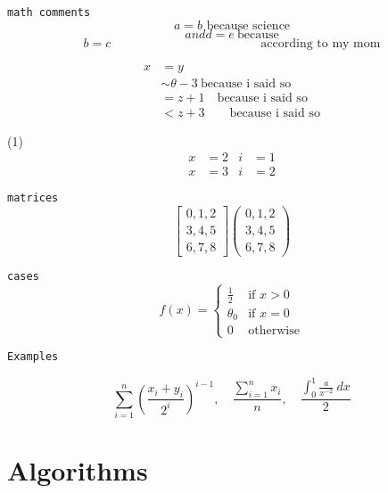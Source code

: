 \documentclass[11pt, oneside]{article}   	%
\newcommand{\bp}[1]{\left( #1 \right)}
\begin{document}
$\ $

\texttt{math comments}
$$ a = b \text{ because science}$$
$$ and d = e \ \text{because}$$
$$ b = c \hspace{2in} \text{according to my mom}$$

\begin{align*}
x &= y \\
&\sim \theta - 3 \ \text{because i said so} \\
&= z + 1 \quad \text{because i said so} \\
&< z + 3 \qquad \text{because i said so}
\end{align*}

(1)
\begin{align*}
x &= 2 & i &= 1 \\
x &= 3 & i &= 2
\end{align*}

\texttt{matrices}
$$ 
\begin{bmatrix} 0,1,2 \\ 3,4,5 \\ 6,7,8 \end{bmatrix} \begin{pmatrix} 0,1,2 \\ 3,4,5 \\ 6,7,8 \end{pmatrix} 
$$

\texttt{cases}
$$f(x) = \begin{cases}
\frac{1}{2} &\text{if } x > 0 \\
\theta_0    &\text{if } x = 0 \\
0 &\text{otherwise}
\end{cases}
$$

\begin{center}
\texttt{Examples}
\end{center}
$$
\sum_{i=1}^n \bp{\frac{x_i+y_i}{2^i}}^{i-1}, \quad
\frac{\sum_{i=1}^n x_i}{n}, \quad
\frac{\int_0^1 \frac{a}{x^{-2}} \ dx}{2}
$$




\newpage

\section{Algorithms} \noindent
\end{document}
